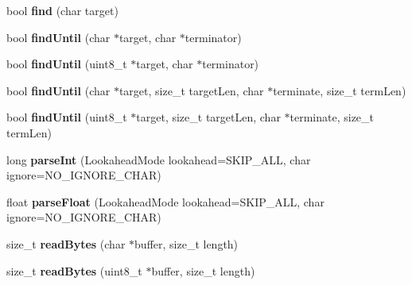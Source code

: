\begin{DoxyCompactItemize}
\item 
bool {\bfseries find} (char target)\hypertarget{class_stream_a4f529a9d7309aedf535fb1a6757a5675}{}\label{class_stream_a4f529a9d7309aedf535fb1a6757a5675}

\item 
bool {\bfseries find\+Until} (char $\ast$target, char $\ast$terminator)\hypertarget{class_stream_ad1f5f6600832396fb38a897baf4de35b}{}\label{class_stream_ad1f5f6600832396fb38a897baf4de35b}

\item 
bool {\bfseries find\+Until} (uint8\+\_\+t $\ast$target, char $\ast$terminator)\hypertarget{class_stream_a167c5236fd76df40d4894aa48e99aa98}{}\label{class_stream_a167c5236fd76df40d4894aa48e99aa98}

\item 
bool {\bfseries find\+Until} (char $\ast$target, size\+\_\+t target\+Len, char $\ast$terminate, size\+\_\+t term\+Len)\hypertarget{class_stream_a3a9497de614792103ab8cb4759e01a69}{}\label{class_stream_a3a9497de614792103ab8cb4759e01a69}

\item 
bool {\bfseries find\+Until} (uint8\+\_\+t $\ast$target, size\+\_\+t target\+Len, char $\ast$terminate, size\+\_\+t term\+Len)\hypertarget{class_stream_ae644144154e17da36a1b89123847b5b1}{}\label{class_stream_ae644144154e17da36a1b89123847b5b1}

\item 
long {\bfseries parse\+Int} (Lookahead\+Mode lookahead=S\+K\+I\+P\+\_\+\+A\+LL, char ignore=N\+O\+\_\+\+I\+G\+N\+O\+R\+E\+\_\+\+C\+H\+AR)\hypertarget{class_stream_a8875d87ed4db36c36990b2fb22ca48da}{}\label{class_stream_a8875d87ed4db36c36990b2fb22ca48da}

\item 
float {\bfseries parse\+Float} (Lookahead\+Mode lookahead=S\+K\+I\+P\+\_\+\+A\+LL, char ignore=N\+O\+\_\+\+I\+G\+N\+O\+R\+E\+\_\+\+C\+H\+AR)\hypertarget{class_stream_a685133574afc1c35223e31703543a0a7}{}\label{class_stream_a685133574afc1c35223e31703543a0a7}

\item 
size\+\_\+t {\bfseries read\+Bytes} (char $\ast$buffer, size\+\_\+t length)\hypertarget{class_stream_a45fd1336a323ea83b16e8507055f44ea}{}\label{class_stream_a45fd1336a323ea83b16e8507055f44ea}

\item 
size\+\_\+t {\bfseries read\+Bytes} (uint8\+\_\+t $\ast$buffer, size\+\_\+t length)\hypertarget{class_stream_a23dd7428e78e86ff41fce45bd618e214}{}\label{class_stream_a23dd7428e78e86ff41fce45bd618e214}


\end{DoxyCompactItemize}

